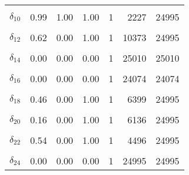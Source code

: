 \begin{longtable}[t]{lrrrrrr}
\cellcolor{gray!6}{$\delta_{9}$} & \cellcolor{gray!6}{0.81} & \cellcolor{gray!6}{0.00} & \cellcolor{gray!6}{1.00} & \cellcolor{gray!6}{1} & \cellcolor{gray!6}{2007} & \cellcolor{gray!6}{24995}\\
$\delta_{10}$ & 0.99 & 1.00 & 1.00 & 1 & 2227 & 24995\\
\cellcolor{gray!6}{$\delta_{11}$} & \cellcolor{gray!6}{0.24} & \cellcolor{gray!6}{0.00} & \cellcolor{gray!6}{1.00} & \cellcolor{gray!6}{1} & \cellcolor{gray!6}{16504} & \cellcolor{gray!6}{24995}\\
$\delta_{12}$ & 0.62 & 0.00 & 1.00 & 1 & 10373 & 24995\\
\cellcolor{gray!6}{$\delta_{13}$} & \cellcolor{gray!6}{0.04} & \cellcolor{gray!6}{0.00} & \cellcolor{gray!6}{0.00} & \cellcolor{gray!6}{1} & \cellcolor{gray!6}{22208} & \cellcolor{gray!6}{22208}\\
$\delta_{14}$ & 0.00 & 0.00 & 0.00 & 1 & 25010 & 25010\\
\cellcolor{gray!6}{$\delta_{15}$} & \cellcolor{gray!6}{0.39} & \cellcolor{gray!6}{0.00} & \cellcolor{gray!6}{1.00} & \cellcolor{gray!6}{1} & \cellcolor{gray!6}{10706} & \cellcolor{gray!6}{24995}\\
$\delta_{16}$ & 0.00 & 0.00 & 0.00 & 1 & 24074 & 24074\\
\cellcolor{gray!6}{$\delta_{17}$} & \cellcolor{gray!6}{0.21} & \cellcolor{gray!6}{0.00} & \cellcolor{gray!6}{1.00} & \cellcolor{gray!6}{1} & \cellcolor{gray!6}{12081} & \cellcolor{gray!6}{24995}\\
$\delta_{18}$ & 0.46 & 0.00 & 1.00 & 1 & 6399 & 24995\\
\cellcolor{gray!6}{$\delta_{19}$} & \cellcolor{gray!6}{0.00} & \cellcolor{gray!6}{0.00} & \cellcolor{gray!6}{0.00} & \cellcolor{gray!6}{1} & \cellcolor{gray!6}{24995} & \cellcolor{gray!6}{24995}\\
$\delta_{20}$ & 0.16 & 0.00 & 1.00 & 1 & 6136 & 24995\\
\cellcolor{gray!6}{$\delta_{21}$} & \cellcolor{gray!6}{0.71} & \cellcolor{gray!6}{0.00} & \cellcolor{gray!6}{1.00} & \cellcolor{gray!6}{1} & \cellcolor{gray!6}{7401} & \cellcolor{gray!6}{24995}\\
$\delta_{22}$ & 0.54 & 0.00 & 1.00 & 1 & 4496 & 24995\\
\cellcolor{gray!6}{$\delta_{23}$} & \cellcolor{gray!6}{0.25} & \cellcolor{gray!6}{0.00} & \cellcolor{gray!6}{1.00} & \cellcolor{gray!6}{1} & \cellcolor{gray!6}{9020} & \cellcolor{gray!6}{24995}\\
$\delta_{24}$ & 0.00 & 0.00 & 0.00 & 1 & 24995 & 24995\\

\end{longtable}
